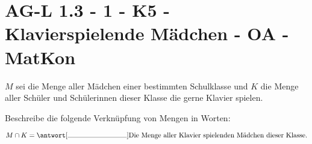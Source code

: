 \section{AG-L 1.3 - 1 - K5 - Klavierspielende Mädchen - OA - MatKon}

\begin{beispiel}[AG-L 1.3]{1}
$M$ sei die Menge aller Mädchen einer bestimmten Schulklasse und $K$ die Menge aller Schüler und Schülerinnen dieser Klasse die gerne Klavier spielen.

Beschreibe die folgende Verknüpfung von Mengen in Worten:\leer

$M\cap K=\antwort[\rule{3cm}{0.3pt}]{\text{Die Menge aller Klavier spielenden Mädchen dieser Klasse.}}$
\end{beispiel}